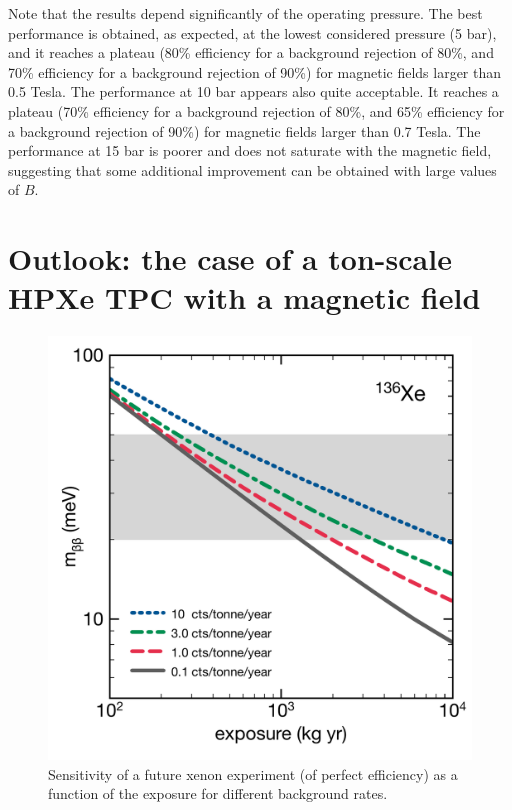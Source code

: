 \documentclass{JINST}
\begin{document}
Note that the results depend significantly of the operating pressure. The best performance is obtained, as expected, at the lowest considered pressure (5 bar), and it reaches a plateau (80\% efficiency for a background rejection of 80\%, and 70\% efficiency for a background rejection of 90\%) for magnetic fields larger than 0.5 Tesla. The performance at 10 bar appears also quite acceptable. It reaches a plateau (70\% efficiency for a background rejection of 80\%, and 65\% efficiency for a background rejection of 90\%) for magnetic fields larger than 0.7 Tesla. The performance at 15 bar is poorer and does not saturate with the magnetic field, suggesting that some additional improvement can be obtained with large values of $B$. 

\section{Outlook: the case of a ton-scale HPXe TPC with a magnetic field}

\begin{figure}[!htb]
\centering
	\includegraphics[scale=0.5]{img/FutureXe136.pdf}
	\caption{\label{fig_futureXe} Sensitivity of a future xenon experiment (of perfect efficiency) as a function
	of the exposure for different background rates.}
\end{figure}
\end{document}
